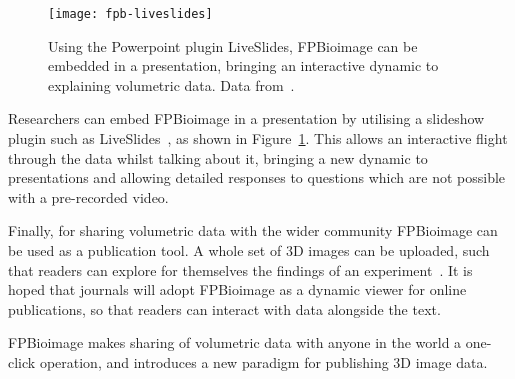 \begin{figure}[htbp!]
\centering
\texttt{[image: fpb-liveslides]}
\caption[FPBioimage: LiveSlides in Powerpoint brings interactive FPBioimage rendering to presentations]{Using the Powerpoint plugin LiveSlides, FPBioimage can be embedded in a presentation, bringing an interactive dynamic to explaining volumetric data. Data from~\cite{kumar2014dual}. } %
\label{fig:fpb-liveslides}
\end{figure}

Researchers can embed FPBioimage in a presentation by utilising a slideshow plugin such as LiveSlides~\cite{liveslides}, as shown in Figure~\ref{fig:fpb-liveslides}. 
This allows an interactive flight through the data whilst talking about it, bringing a new dynamic to presentations and allowing detailed responses to questions which are not possible with a pre-recorded video. 

Finally, for sharing volumetric data with the wider community FPBioimage can be used as a publication tool. 
A whole set of 3D images can be uploaded, such that readers can explore for themselves the findings of an experiment~\cite{teplensky2017temperature}.
It is hoped that journals will adopt FPBioimage as a dynamic viewer for online publications, so that readers can interact with data alongside the text. 

FPBioimage makes sharing of volumetric data with anyone in the world a one-click operation, and introduces a new paradigm for publishing 3D image data. 